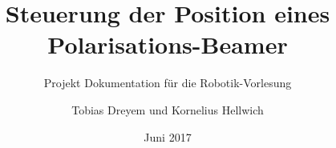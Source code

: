 \documentclass[
	paper=a4,
	a4paper,
	11pt,
	abstract=on,
	]{scrartcl}
\title{Steuerung der Position eines Polarisations-Beamer}
\subtitle{Projekt Dokumentation für die Robotik-Vorlesung}
\author{Tobias Dreyem und Kornelius Hellwich}
\date{Juni 2017}
\begin{document}
	\titlehead{\vspace{-50pt}\centering\texttt{[image: images/dhbw.png]}\vspace{-50pt}}
	
	\maketitle
	
	
	\tableofcontents
	\clearpage

	\pagestyle{headings}
	
	
	
\end{document}
